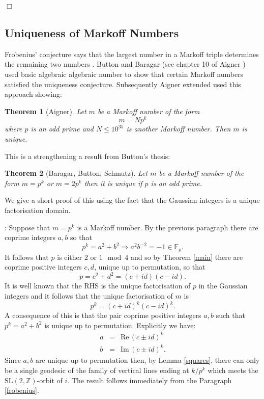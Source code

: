 \documentclass[12pt,a4paper]{amsart}
\newtheorem{thm}{Theorem}[section]
\def\ZZ{\mathbb{Z}}
\def\fp{\mathbb{F}_p}
\def\sl2{\mathrm{SL}(2, \ZZ)}
\begin{document}
\hfill $\Box$
 
 \subsection{Uniqueness of Markoff Numbers}
 
 Frobenius' conjecture says that the largest number in a Markoff triple determines
 the remaining two numbers \cite{aigner}. Button and Baragar (see chapter 10 of Aigner \cite{aigner})
 used  basic algebraic algebraic number to show that certain Markoff numbers satisfied
 the uniqueness conjecture. Subsequently Aigner extended used this approach showing:
 
 \begin{thm}[Aigner]
 Let $m$ be a Markoff number of the form 
 $$m =Np^k$$
 where $p$ is an odd prime and $N \leq 10^{35}$ is another Markoff number. Then $m$ is unique.
 \end{thm}
 
 This is a strengthening a result from Button's thesis:
 
  \begin{thm}[Baragar, Button, Schmutz] \label{button}
 Let $m$ be a Markoff number of the form 
 $m=p^k$ or $m=2p^k$ then it is unique
if $p$ is an odd prime.
 \end{thm}

We give a short proof of this using the fact that the Gaussian integers
 is a unique factorisation domain.

\proof: Suppose that $m=p^k$ is a Markoff number. By the previous paragraph there are coprime integers $a,b$ so that 
$$p^k = a^2 + b^2 \Rightarrow a^2b^{-2} = -1 \in \fp.$$
It follows that $p$ is either $2$ or $1 \mod 4$ and 
so by Theorem \ref{main} there are coprime positive integers $c,d$,
 unique up to permutation,
so that  $$p = c^2 + d^2 = (c + id)(c - id).$$
It is well known that the RHS is the unique factorisation of $p$ in the Gaussian integers
and it follows that the unique factorisation of $m$ is
$$p^k = (c + id)^k(c - id)^k.$$
A consequence of this is that the pair coprime positive integers $a,b$ such that $p^k = a^2 + b^2$
is unique up to permutation. Explicitly we have:
\begin{eqnarray}
a &=& \mathrm{Re}\, (c\pm id)^k \\
b &=& \mathrm{Im}\, (c\pm id)^k.
\end{eqnarray}
Since $a,b$ are unique up to permutation 
then, by Lemma \ref{squares},
 there can only be a single  geodesic of the family
of vertical lines ending at  
$k/p^k$ which meets the $\sl2$-orbit of $i$.
The result follows immediately from the  Paragraph \ref{frobenius}.
\end{document}

